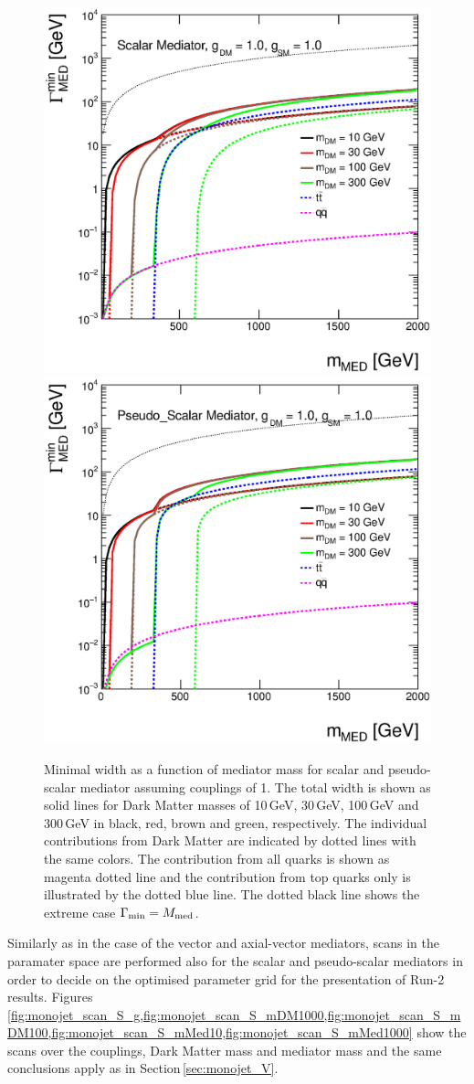 \begin{figure}
\centering
\includegraphics[width=0.45\linewidth]{figures/monojet/width_S.eps}
\includegraphics[width=0.45\linewidth]{figures/monojet/width_P.eps}
\caption{Minimal width as a function of mediator mass for scalar and pseudo-scalar mediator assuming couplings of 1. The total width is shown as solid lines for Dark Matter masses of 10\,GeV, 30\,GeV, 100\,GeV and 300\,GeV in black, red, brown and green, respectively. The individual contributions from Dark Matter are indicated by dotted lines with the same colors. The contribution from all quarks is shown as magenta dotted line and the contribution from top quarks only is illustrated by the dotted blue line. The dotted black line shows the extreme case $\Gamma_{\rm{min}}=M_{\rm{med}}$.}
\label{fig:monojet_width_S}
\end{figure}


Similarly as in the case of the vector and axial-vector mediators, scans in the paramater space are performed also for the scalar and pseudo-scalar mediators in order to decide on the optimised parameter grid for the presentation of Run-2 results. Figures\,\ref{fig:monojet_scan_S_g,fig:monojet_scan_S_mDM1000,fig:monojet_scan_S_mDM100,fig:monojet_scan_S_mMed10,fig:monojet_scan_S_mMed1000} show the scans over the couplings, Dark Matter mass and mediator mass and the same conclusions apply as in Section\,\ref{sec:monojet_V}.


